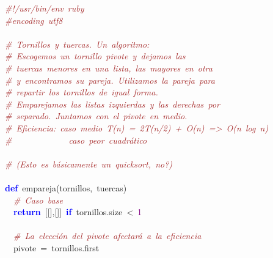 \noindent
\mbox{}\textit{\textcolor{Brown}{\#!/usr/bin/env\ ruby}} \\
\mbox{}\textit{\textcolor{Brown}{\#encoding\ utf8}} \\
\mbox{} \\
\mbox{}\textit{\textcolor{Brown}{\#\ Tornillos\ y\ tuercas.\ Un\ algoritmo:}} \\
\mbox{}\textit{\textcolor{Brown}{\#\ Escogemos\ un\ tornillo\ pivote\ y\ dejamos\ las}} \\
\mbox{}\textit{\textcolor{Brown}{\#\ tuercas\ menores\ en\ una\ lista,\ las\ mayores\ en\ otra}} \\
\mbox{}\textit{\textcolor{Brown}{\#\ y\ encontramos\ su\ pareja.\ Utilizamos\ la\ pareja\ para}} \\
\mbox{}\textit{\textcolor{Brown}{\#\ repartir\ los\ tornillos\ de\ igual\ forma.}} \\
\mbox{}\textit{\textcolor{Brown}{\#\ Emparejamos\ las\ listas\ izquierdas\ y\ las\ derechas\ por}} \\
\mbox{}\textit{\textcolor{Brown}{\#\ separado.\ Juntamos\ con\ el\ pivote\ en\ medio.}} \\
\mbox{}\textit{\textcolor{Brown}{\#\ Eficiencia:\ caso\ medio\ T(n)\ =\ 2T(n/2)\ +\ O(n)\ =\textgreater{}\ O(n\ log\ n)}} \\
\mbox{}\textit{\textcolor{Brown}{\#\ \ \ \ \ \ \ \ \ \ \ \ \ caso\ peor\ cuadrático}} \\
\mbox{} \\
\mbox{}\textit{\textcolor{Brown}{\#\ (Esto\ es\ básicamente\ un\ quicksort,\ no?)}} \\
\mbox{} \\
\mbox{}\textbf{\textcolor{Blue}{def}}\ empareja\textcolor{BrickRed}{(}tornillos\textcolor{BrickRed}{,}\ tuercas\textcolor{BrickRed}{)} \\
\mbox{}\ \ \textit{\textcolor{Brown}{\#\ Caso\ base}} \\
\mbox{}\ \ \textbf{\textcolor{Blue}{return}}\ \textcolor{BrickRed}{[[],[]]}\ \textbf{\textcolor{Blue}{if}}\ tornillos\textcolor{BrickRed}{.}size\ \textcolor{BrickRed}{\textless{}}\ \textcolor{Purple}{1} \\
\mbox{} \\
\mbox{}\ \ \textit{\textcolor{Brown}{\#\ La\ elección\ del\ pivote\ afectará\ a\ la\ eficiencia}} \\
\mbox{}\ \ pivote\ \textcolor{BrickRed}{=}\ tornillos\textcolor{BrickRed}{.}first \\
